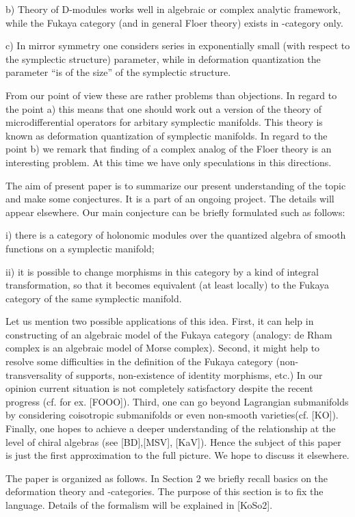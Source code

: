 \documentclass[a4paper,12pt]{article}
\begin{document}
b) Theory of D-modules works well in algebraic or complex
analytic framework, while the Fukaya category (and in general
Floer theory) exists in \coordHE{}-category only.

c) In mirror symmetry one considers series in exponentially small (with respect to
the symplectic structure) parameter, while in deformation quantization
the parameter ``is of the size'' of the symplectic structure.


From our point of view these are rather problems  than objections.
In regard to the point a)  this means that one should work
out a version of the theory of microdifferential operators
for arbitary symplectic manifolds. 
 This theory is known as deformation
quantization of symplectic manifolds. 
In regard to the point b) we remark that
finding of a complex analog of the Floer theory is 
an interesting problem. At this time we have only speculations
in this directions. 

The aim of present paper is to summarize our present understanding 
of the topic and make some conjectures. It is a part of an ongoing project.
The details will appear elsewhere.
Our main conjecture can be briefly formulated such as follows:

i) there is a category of holonomic modules over the
 quantized  algebra of smooth functions
on a symplectic manifold;

ii) it is possible to change morphisms in this category by a kind of integral
transformation,
so that it becomes equivalent (at least locally) to the Fukaya
category of the same symplectic manifold.


Let us mention two possible applications of this idea.
First, it can help in constructing of an  algebraic model of the Fukaya category
(analogy: de Rham complex is an algebraic model of Morse complex).
Second, it might help to resolve some difficulties
in the definition of the Fukaya category (non-transversality
of supports, non-existence of identity morphisms, etc.)
In our opinion current situation is not completely satisfactory
despite
the recent progress (cf. for ex. [FOOO]).
Third, one can go beyond Lagrangian submanifolds by considering
coisotropic submanifolds or even non-smooth varieties(cf. [KO]).
Finally, one hopes to achieve a deeper understanding
of the relationship at the level of chiral algebras (see 
[BD],[MSV], [KaV]). Hence the 
subject of this paper is just the first approximation
to the full picture. We hope to discuss it
elsewhere.

The paper is organized as follows. In Section 2 
we briefly recall basics on the deformation theory and \myHighlight{$\A$}\coordHE{}-categories.
The purpose of this section is to fix the language.
Details of the formalism will be explained in [KoSo2].
\end{document}
